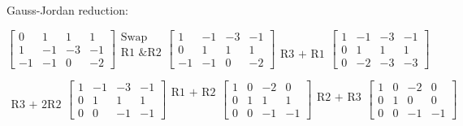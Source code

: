 \documentclass[12pt, a4paper, twoside, openright]{book}
\begin{document}
Gauss-Jordan reduction:

\begin{equation*} 
\begin{bmatrix}
0  &  1 & 1  &  1 \\
1  & -1 & -3 & -1 \\
-1 & -1 & 0  & -2
\end{bmatrix}
\begin{matrix}
\text{Swap} \\
\text{R1 \& R2} \\
\\
\end{matrix}
\begin{bmatrix}
1  & -1 & -3 & -1 \\
0  &  1 & 1  &  1 \\
-1 & -1 & 0  & -2
\end{bmatrix}
\begin{matrix}
\\
\\
\text{R3 + R1}
\end{matrix}
\begin{bmatrix}
1  & -1 & -3 & -1 \\
0  &  1 & 1  &  1 \\
0 & -2 & -3  & -3
\end{bmatrix} 
\end{equation*}

\begin{equation*}
\begin{matrix}
\\
\\
\text{R3 + 2R2}
\end{matrix}
\begin{bmatrix}
1  & -1 & -3 & -1 \\
0  &  1 & 1  &  1 \\
0  &  0 & -1 & -1
\end{bmatrix}
\begin{matrix}
\text{R1 + R2} \\
\\
\\
\end{matrix}
\begin{bmatrix}
1  &  0 & -2 & 0 \\
0  &  1 & 1  &  1 \\
0  &  0 & -1 & -1
\end{bmatrix}
\begin{matrix}
\\
\text{R2 + R3} \\
\\
\end{matrix}
\begin{bmatrix}
1  &  0 & -2 & 0 \\
0  &  1 & 0  & 0 \\
0  &  0 & -1 & -1
\end{bmatrix}
\end{equation*}
\end{document}
